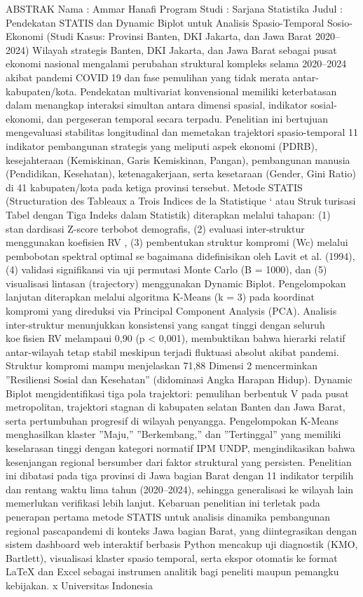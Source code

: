 ABSTRAK
Nama : Ammar Hanafi
Program Studi : Sarjana Statistika
Judul : Pendekatan STATIS dan Dynamic Biplot untuk Analisis
Spasio-Temporal Sosio-Ekonomi (Studi Kasus: Provinsi
Banten, DKI Jakarta, dan Jawa Barat 2020–2024)
Wilayah strategis Banten, DKI Jakarta, dan Jawa Barat sebagai pusat ekonomi nasional
mengalami perubahan struktural kompleks selama 2020–2024 akibat pandemi COVID19 dan fase pemulihan yang tidak merata antar-kabupaten/kota. Pendekatan multivariat
konvensional memiliki keterbatasan dalam menangkap interaksi simultan antara dimensi
spasial, indikator sosial-ekonomi, dan pergeseran temporal secara terpadu. Penelitian ini
bertujuan mengevaluasi stabilitas longitudinal dan memetakan trajektori spasio-temporal
11 indikator pembangunan strategis yang meliputi aspek ekonomi (PDRB), kesejahteraan
(Kemiskinan, Garis Kemiskinan, Pangan), pembangunan manusia (Pendidikan, Kesehatan),
ketenagakerjaan, serta kesetaraan (Gender, Gini Ratio) di 41 kabupaten/kota pada ketiga
provinsi tersebut.
Metode STATIS (Structuration des Tableaux a Trois Indices de la Statistique ` atau Strukturisasi Tabel dengan Tiga Indeks dalam Statistik) diterapkan melalui tahapan: (1) standardisasi Z-score terbobot demografis, (2) evaluasi inter-struktur menggunakan koefisien
RV , (3) pembentukan struktur kompromi (Wc) melalui pembobotan spektral optimal sebagaimana didefinisikan oleh Lavit et al. (1994), (4) validasi signifikansi via uji permutasi
Monte Carlo (B = 1000), dan (5) visualisasi lintasan (trajectory) menggunakan Dynamic
Biplot. Pengelompokan lanjutan diterapkan melalui algoritma K-Means (k = 3) pada
koordinat kompromi yang direduksi via Principal Component Analysis (PCA).
Analisis inter-struktur menunjukkan konsistensi yang sangat tinggi dengan seluruh koefisien RV melampaui 0,90 (p < 0,001), membuktikan bahwa hierarki relatif antar-wilayah
tetap stabil meskipun terjadi fluktuasi absolut akibat pandemi. Struktur kompromi mampu
menjelaskan 71,88%
Dimensi 2 mencerminkan ”Resiliensi Sosial dan Kesehatan” (didominasi Angka Harapan
Hidup). Dynamic Biplot mengidentifikasi tiga pola trajektori: pemulihan berbentuk V pada
pusat metropolitan, trajektori stagnan di kabupaten selatan Banten dan Jawa Barat, serta
pertumbuhan progresif di wilayah penyangga. Pengelompokan K-Means menghasilkan
klaster ”Maju,” ”Berkembang,” dan ”Tertinggal” yang memiliki keselarasan tinggi dengan
kategori normatif IPM UNDP, mengindikasikan bahwa kesenjangan regional bersumber
dari faktor struktural yang persisten.
Penelitian ini dibatasi pada tiga provinsi di Jawa bagian Barat dengan 11 indikator
terpilih dan rentang waktu lima tahun (2020–2024), sehingga generalisasi ke wilayah
lain memerlukan verifikasi lebih lanjut. Kebaruan penelitian ini terletak pada penerapan
pertama metode STATIS untuk analisis dinamika pembangunan regional pascapandemi di
konteks Jawa bagian Barat, yang diintegrasikan dengan sistem dashboard web interaktif
berbasis Python mencakup uji diagnostik (KMO, Bartlett), visualisasi klaster spasiotemporal, serta ekspor otomatis ke format LaTeX dan Excel sebagai instrumen analitik
bagi peneliti maupun pemangku kebijakan.
x Universitas Indonesia

